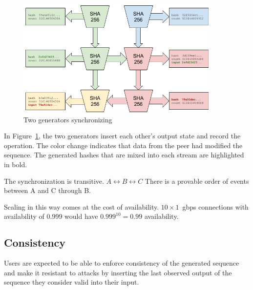 \documentclass[12pt]{article}
\begin{document}
\begin{figure}
  \begin{center}
    \centering
    \includegraphics[width=0.9\textwidth]{figures/fig_5.png}
    \caption[Fig 5]{Two generators synchronizing\label{fig:poh_scale}}
  \end{center}
  \end{figure}

In Figure~\ref{fig:poh_scale}, the two generators insert each other’s output state and record the operation. The color change indicates that data from the peer had modified the sequence. The generated hashes that are mixed into each stream are highlighted in bold.

The synchronization is transitive. \(A \leftrightarrow B \leftrightarrow C\)  There is a provable order of events between A and C through B.

Scaling in this way comes at the cost of availability. $10 \times 1$~gbps connections with availability of 0.999 would have \(0.999^{10} = 0.99 \) availability.

\subsection{Consistency}
Users are expected to be able to enforce consistency of the generated sequence and make it resistant to attacks by inserting the last observed output of the sequence they consider valid into their input.\\
\end{document}

